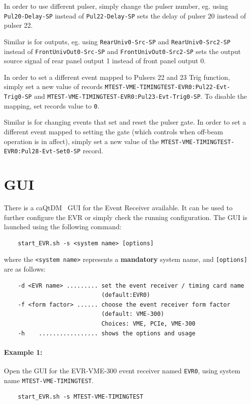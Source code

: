 \documentclass[12pt,a4paper]{article}
\begin{document}
In order to use different pulser, simply change the pulser number, eg. using \texttt{Pul20-Delay-SP} instead of \texttt{Pul22-Delay-SP} sets the delay of pulser 20 instead of pulser 22.

Similar is for outputs, eg. using \texttt{RearUniv0-Src-SP} and \texttt{RearUniv0-Src2-SP} instead of \texttt{FrontUnivOut0-Src-SP} and \texttt{FrontUnivOut0-Src2-SP} sets the output source signal of rear panel output 1 instead of front panel output 0. 

In order to set a different event mapped to Pulsers 22 and 23 Trig function, simply set a new value of records \texttt{MTEST-VME-TIMINGTEST-EVR0:Pul22-Evt-Trig0-SP} and \texttt{MTEST-VME-TIMINGTEST-EVR0:Pul23-Evt-Trig0-SP}. To disable the mapping, set records value to \texttt{0}.

Similar is for changing events that set and reset the pulser gate. In order to set a different event mapped to setting the gate (which controls when off-beam operation is in affect), simply set a new value of the \newline\texttt{MTEST-VME-TIMINGTEST-EVR0:Pul28-Evt-Set0-SP} record.


\section{GUI}\label{sec:gui} 
There is a caQtDM~\cite{caqtdm} GUI for the Event Receiver available. It can be used to further configure the EVR or simply check the running configuration. The GUI is launched using the following command:

\begin{verbatim}
	start_EVR.sh -s <system name> [options]
\end{verbatim}
where the \texttt{<system name>} represents a \textbf{mandatory} system name, and \texttt{[options]} are as follows:
\begin{verbatim}
	-d <EVR name> ......... set the event receiver / timing card name 
	                        (default:EVR0)
	-f <form factor> ...... choose the event receiver form factor 
	                        (default: VME-300)
	                        Choices: VME, PCIe, VME-300
	-h    ................. shows the options and usage
\end{verbatim}


\paragraph{Example 1:} Open the GUI for the EVR-VME-300 event receiver named \texttt{EVR0}, using system name \texttt{MTEST-VME-TIMINGTEST}.
\begin{verbatim}
	start_EVR.sh -s MTEST-VME-TIMINGTEST
\end{verbatim}
\end{document}
